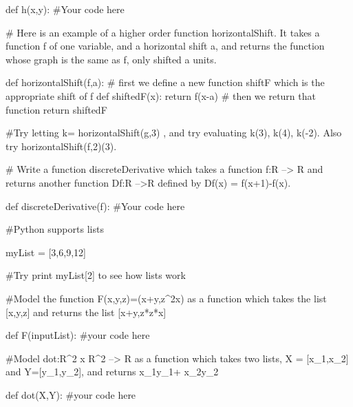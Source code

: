 def h(x,y):
	#Your code here
	
# Here is an example of a higher order function horizontalShift.  It takes a function f of one variable, and a horizontal shift a, and returns the function whose graph is the same as f, only shifted a units.

def horizontalShift(f,a):
	# first we define a new function shiftF which is the appropriate shift of f
	def shiftedF(x):  
		return f(x-a) 
	# then we return that function
	return shiftedF

#Try  letting  k= horizontalShift(g,3) 	, and try evaluating k(3), k(4), k(-2).  Also try horizontalShift(f,2)(3).

# Write a function discreteDerivative which takes a function f:R --> R and returns another function Df:R -->R defined by Df(x) = f(x+1)-f(x).

def discreteDerivative(f):
	#Your code here
	
#Python supports lists

	myList = [3,6,9,12]

#Try print myList[2] to see how lists work

#Model the function F(x,y,z)=(x+y,z^2x) as a function which takes the list [x,y,z] and returns the list [x+y,z*z*x]

def F(inputList):
	#your code here
	
#Model dot:R^2 x R^2 --> R as a function which takes two lists, X = [x_1,x_2] and Y=[y_1,y_2], and returns x_1y_1+ x_2y_2

def dot(X,Y):
	#your code here
	




